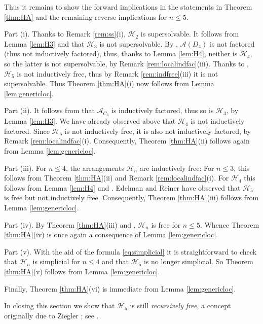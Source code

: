 \documentclass[12pt]{amsart}
\newcommand\CA{{\mathscr A}}
\newcommand\CH{{\mathscr H}}
\numberwithin{equation}{section}
\theoremstyle{plain}
\theoremstyle{definition}
\begin{document}
Thus it remains to show the forward implications in the statements in Theorem \ref{thm:HA} and the remaining reverse implications for $n \le 5$.

Part (i).
Thanks to Remark \ref{rem:ss}(i), $\CH_2$ is supersolvable. 
It follows from Lemma \ref{lem:H3} and  
\cite[Cor.~8.11]{cuntzkuehne:subgraphs} that $\CH_3$ 
is not supersolvable. 
By \cite[Lem.~3.2]{hogeroehrle:nice}, $\CA(D_4)$ is not factored (thus not inductively factored), thus, thanks to Lemma \ref{lem:H4}, neither is $\CH_4$, so the latter is not supersolvable, by  Remark \ref{rem:localindfac}(iii). Thanks to  \cite{edelmanreiner:orlik}, $\CH_5$ is not inductively free, thus by Remark \ref{rem:indfree}(iii) it is not supersolvable. 
Thus Theorem \ref{thm:HA}(i) now follows from Lemma \ref{lem:genericloc}.

Part (ii).
It follows from  \cite[Thm.~1.7]{GMMR} that $\CA_{C_3}$ is inductively factored, thus so is $\CH_3$, by Lemma \ref{lem:H3}.
We have already observed above that $\CH_4$ is not inductively factored. 
Since $\CH_5$ is not inductively free, it is also not inductively factored, by Remark \ref{rem:localindfac}(i).
Consequently, Theorem \ref{thm:HA}(ii) follows again from Lemma \ref{lem:genericloc}.

Part (iii).
For $n \le 4$, the arrangements $\CH_n$ are inductively free: 
For $n \le 3$, this follows from Theorem \ref{thm:HA}(ii) and Remark \ref{rem:localindfac}(i).
	For $\CH_4$ this follows from Lemma \ref{lem:H4} and \cite[Ex.~2.6]{jambuterao:free}.
Edelman and Reiner \cite{edelmanreiner:orlik} have observed that 
$\CH_5$ is free but not inductively free.
Consequently, Theorem \ref{thm:HA}(iii) follows from Lemma \ref{lem:genericloc}.
	
Part (iv).
By  Theorem \ref{thm:HA}(iii) and \cite{edelmanreiner:orlik},  $\CH_n$ is free for $n \le 5$. 
Whence Theorem \ref{thm:HA}(iv) is once again a consequence of Lemma \ref{lem:genericloc}. 

Part (v).
With the aid of the formula \eqref{eq:simplicial} it is straightforward to 
check that $\CH_n$ is simplicial for $n \le 4$ and that $\CH_5$ is no longer simplicial. So Theorem \ref{thm:HA}(v) follows from Lemma \ref{lem:genericloc}.

Finally, Theorem \ref{thm:HA}(vi) is immediate from Lemma \ref{lem:genericloc}.

In closing this section 
we show that $\CH_5$ is still \emph{recursively free}, a concept originally due to Ziegler \cite{ziegler:phd}; see  
\cite[Def.~4.60]{orlikterao:arrangements}.
\end{document}
